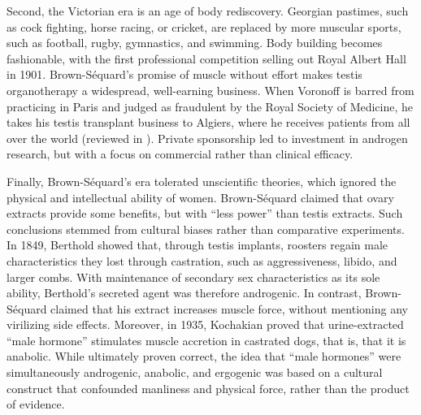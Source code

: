 \documentclass[12pt,english]{report}\usepackage[]{graphicx}\usepackage[]{color}
\begin{document}
Second, the Victorian era is an age of body rediscovery. Georgian
pastimes, such as cock fighting, horse racing, or cricket, are replaced
by more muscular sports, such as football, rugby, gymnastics, and
swimming. Body building becomes fashionable, with the first professional
competition selling out Royal Albert Hall in 1901. Brown-Séquard's
promise of muscle without effort makes testis organotherapy a widespread,
well-earning business. When Voronoff is barred from practicing in
Paris and judged as fraudulent by the Royal Society of Medicine, he
takes his testis transplant business to Algiers, where he receives
patients from all over the world (reviewed in \citep{nieschlag2014testosterone}).
Private sponsorship led to investment in androgen research, but with
a focus on commercial rather than clinical efficacy.

Finally, Brown-Séquard's era tolerated unscientific theories, which
ignored the physical and intellectual ability of women. Brown-Séquard
claimed that ovary extracts provide some benefits, but with ``less
power'' than testis extracts\citep{brown-sequard1893new}. Such conclusions
stemmed from cultural biases rather than comparative experiments.
In 1849, Berthold showed that, through testis implants, roosters regain
male characteristics they lost through castration, such as aggressiveness,
libido, and larger combs\citep{berthold1849transplantation}. With
maintenance of secondary sex characteristics as its sole ability,
Berthold's secreted agent was therefore androgenic. In contrast, Brown-Séquard
claimed that his extract increases muscle force, without mentioning
any virilizing side effects. Moreover, in 1935, Kochakian proved that
urine-extracted ``male hormone'' stimulates muscle accretion in
castrated dogs, that is, that it is anabolic\citep{kochakian1935effect}.
While ultimately proven correct, the idea that ``male hormones''
were simultaneously androgenic, anabolic, and ergogenic was based
on a cultural construct that confounded manliness and physical force,
rather than the product of evidence.
\end{document}
